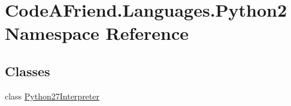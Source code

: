 \hypertarget{namespace_code_a_friend_1_1_languages_1_1_python2}{}\section{Code\+A\+Friend.\+Languages.\+Python2 Namespace Reference}
\label{namespace_code_a_friend_1_1_languages_1_1_python2}
\subsection*{Classes}
\begin{DoxyCompactItemize}
\item 
class \mbox{\hyperlink{class_code_a_friend_1_1_languages_1_1_python2_1_1_python27_interpreter}{Python27\+Interpreter}}
\end{DoxyCompactItemize}
